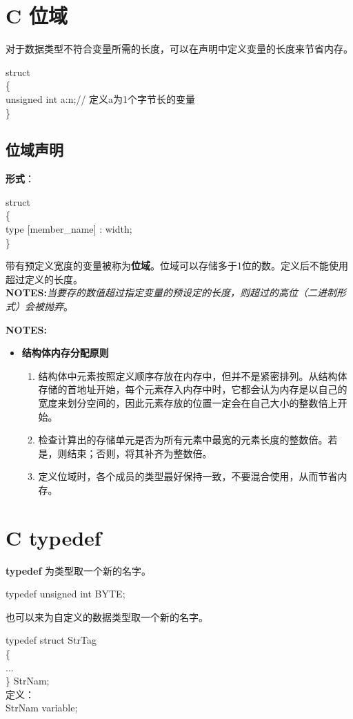 \documentclass[UTF8]{ctexart}
\begin{document}
			\clearpage
			\section{C 位域}
			对于数据类型不符合变量所需的长度，可以在声明中定义变量的长度来节省内存。\begin{framed}
				struct \\
				\{\\
					unsigned int a:n;// 定义a为1个字节长的变量 \\ 
				\}\\
			\end{framed}
			
			\subsection{位域声明}
			\textbf{形式}：\begin{framed}
				struct\\
				\{\\
					type [member\_name] : width;\\
				\}\\
			\end{framed}
			带有预定义宽度的变量被称为\textbf{位域}。位域可以存储多于1位的数。定义后不能使用超过定义的长度。\\\textbf{NOTES:}\emph{当要存的数值超过指定变量的预设定的长度，则超过的高位（二进制形式）会被抛弃}。

			\begin{framed}
				\textbf{NOTES:}
				\begin{itemize}
					\item \textbf{结构体内存分配原则}\begin{enumerate}
						\item 结构体中元素按照定义顺序存放在内存中，但并不是紧密排列。从结构体存储的首地址开始，每个元素存入内存中时，它都会认为内存是以自己的宽度来划分空间的，因此元素存放的位置一定会在自己大小的整数倍上开始。
						\item 检查计算出的存储单元是否为所有元素中最宽的元素长度的整数倍。若是，则结束；否则，将其补齐为整数倍。
						\item 定义位域时，各个成员的类型最好保持一致，不要混合使用，从而节省内存。
					\end{enumerate}
				\end{itemize}
			\end{framed}

			\clearpage
			\section{C typedef}
			\textbf{typedef} 为类型取一个新的名字。
			\begin{framed}
				typedef unsigned int BYTE;
			\end{framed}
			也可以来为自定义的数据类型取一个新的名字。
			\begin{framed}
				typedef struct StrTag\\
				\{\\
					...\\
				\} StrNam;\\
				
				定义：\\
				StrNam variable;
			\end{framed}
\end{document}
